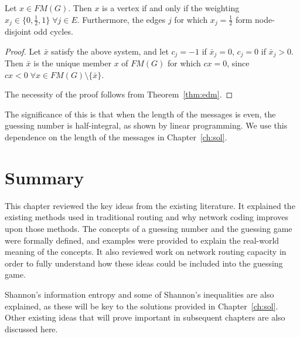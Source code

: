 \newpage

\begin{theorem}
	Let $x \in FM(G)$. Then $x$ is a vertex if and only if the weighting $x_j \in \{ 0, \frac{1}{2}, 1 \} \; \forall j \in E$. Furthermore, the edges $j$ for which $x_j = \frac{1}{2}$ form node-disjoint odd cycles.
	\label{thm:pul}
\end{theorem}
\begin{proof}
Let $\bar{x}$ satisfy the above system, and let $c_j = -1$ if $\bar{x}_j = 0$, $c_j = 0$ if $\bar{x}_j > 0$. Then $\bar{x}$ is the unique member $x$ of $FM(G)$ for which $cx = 0$, since $cx < 0 \; \forall x \in FM(G) \setminus \{ \bar{x} \}$.

The necessity of the proof follows from Theorem~\ref{thm:edm}.
\end{proof}

The significance of this is that when the length of the messages is even, the guessing number is half-integral, as shown by linear programming. We use this dependence on the length of the messages in Chapter~\ref{ch:sol}.

\section{Summary}

This chapter reviewed the key ideas from the existing literature. It explained the existing methods used in traditional routing and why network coding improves upon those methods. The concepts of a guessing number and the guessing game were formally defined, and examples were provided to explain the real-world meaning of the concepts. It also reviewed work on network routing capacity in order to fully understand how these ideas could be included into the guessing game.

Shannon's information entropy and some of Shannon's inequalities are also explained, as these will be key to the solutions provided in Chapter~\ref{ch:sol}. Other existing ideas that will prove important in subsequent chapters are also discussed here.